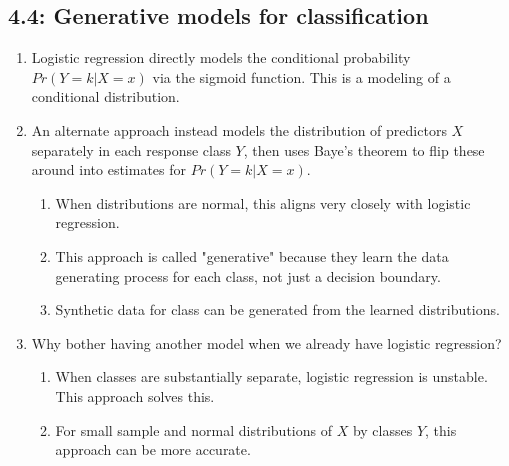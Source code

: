 \documentclass{article}
\begin{document}
\subsection*{4.4: Generative models for classification}

\begin{enumerate}
\item Logistic regression directly models the conditional probability $Pr(Y=k | X=x)$ via the sigmoid function. This is a modeling of a conditional distribution.

\item An alternate approach instead models the distribution of predictors $X$ separately in each response class $Y$, then uses Baye's theorem to flip these around into estimates for $Pr(Y=k | X=x)$. 
\begin{enumerate}
\item When distributions are normal, this aligns very closely with logistic regression. 
\item This approach is called "generative" because they learn the data generating process for each class, not just a decision boundary.
\item Synthetic data for class can be generated from the learned distributions.
\end{enumerate}

\item Why bother having another model when we already have logistic regression?
\begin{enumerate}
\item When classes are substantially separate, logistic regression is unstable. This approach solves this.
\item For small sample and normal distributions of $X$ by classes $Y$, this approach can be more accurate.
\end{enumerate}


\end{enumerate}
\end{document}
